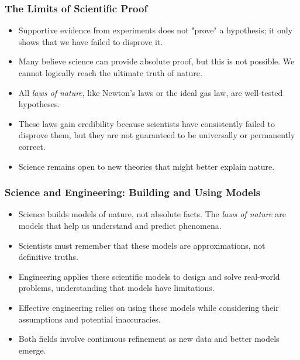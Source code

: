 \documentclass{beamer}
\begin{document}
%
\begin{frame}
\frametitle{The Limits of Scientific Proof}
\begin{itemize}
    \item Supportive evidence from experiments does not "prove" a hypothesis; it only shows that we have failed to disprove it.
    \item Many believe science can provide absolute proof, but this is not possible. We cannot logically reach the ultimate truth of nature.
    \item All \emph{laws of nature}, like Newton's laws or the ideal gas law, are well-tested hypotheses. 
    \item These laws gain credibility because scientists have consistently failed to disprove them, but they are not guaranteed to be universally or permanently correct.
    \item Science remains open to new theories that might better explain nature.
\end{itemize}
\end{frame}
%
\begin{frame}
\frametitle{Science and Engineering: Building and Using Models}
\begin{itemize}
    \item Science builds models of nature, not absolute facts. The \emph{laws of nature} are models that help us understand and predict phenomena.
    \item Scientists must remember that these models are approximations, not definitive truths.
    \item Engineering applies these scientific models to design and solve real-world problems, understanding that models have limitations.
    \item Effective engineering relies on using these models while considering their assumptions and potential inaccuracies.
    \item Both fields involve continuous refinement as new data and better models emerge.
\end{itemize}
\end{frame}
%
\end{document}
